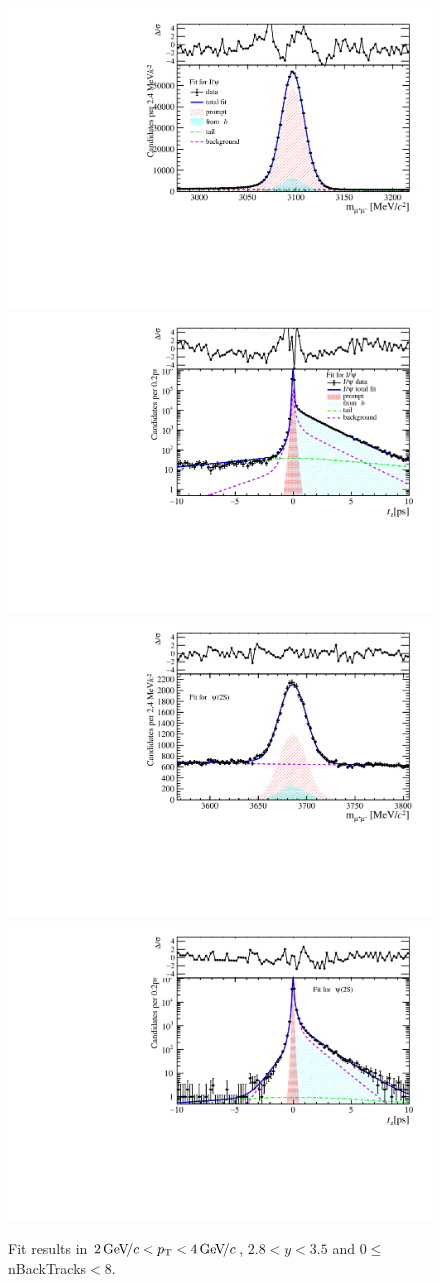 \begin{figure}[H]
\begin{center}
\includegraphics[width=0.47\linewidth]{pdf/Jpsi/drawmassB/n1y2pt2.pdf}
\includegraphics[width=0.47\linewidth]{pdf/Jpsi/2DFitB/n1y2pt2.pdf}
\vspace*{-0.5cm}
\includegraphics[width=0.47\linewidth]{pdf/Psi2S/drawmassB/n1y2pt2.pdf}
\includegraphics[width=0.47\linewidth]{pdf/Psi2S/2DFitB/n1y2pt2.pdf}
\vspace*{-0.5cm}
\end{center}
\caption{Fit results in $2\text{\,Ge\kern -0.1em V\!/}c<p_{\mathrm{T}}<4\text{\,Ge\kern -0.1em V\!/}c$, $2.8<y<3.5$ and 0$\leq$nBackTracks$<$8.}
\label{Fitn1y2pt2}
\end{figure}
